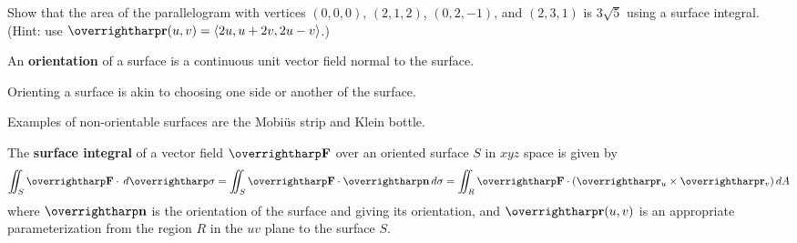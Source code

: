 \documentclass[letterpaper, twoside, 12pt]{book}
\begin{document}
          \begin{solution}

          \end{solution}

          \begin{contributors}

          \end{contributors}

          \begin{problem}
            Show that the area of the parallelogram with vertices $(0,0,0)$,
            $(2,1,2)$, $(0,2,-1)$, and $(2,3,1)$ is $3\sqrt{5}$ using a surface
            integral.
            (Hint: use $\vect{r}(u,v)=\<2u,u+2v,2u-v\>$.)
          \end{problem}

          \begin{solution}

          \end{solution}

          \begin{contributors}

          \end{contributors}

\begin{definition}
  An \textbf{orientation} of a surface is a continuous unit
  vector field normal to the surface.
\end{definition}

\begin{remark}
  Orienting a surface is akin to choosing one side or another of the surface.
\end{remark}

\begin{remark}
  Examples of non-orientable surfaces are the Mobi\"us strip and Klein bottle.
\end{remark}

\begin{definition}
  The \textbf{surface integral} of a vector field $\vect{F}$ over an
  oriented surface $S$ in $xyz$ space is given by
  \[
    \iint_S \vect{F}\cdot\dvar{\vect\sigma}
      =
    \iint_S \vect{F}\cdot\vect{n}\dvar\sigma
      =
    \iint_R \vect{F}\cdot(\vect{r}_u\times\vect{r}_v)\dvar{A}
  \]
  where $\vect n$ is the orientation of the surface and giving
  its orientation, and
  $\vect{r}(u,v)$ is an appropriate parameterization from the region $R$ in
  the $uv$ plane to the surface $S$.
\end{definition}
\end{document}
